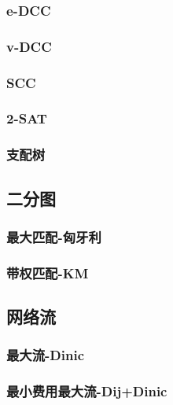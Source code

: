 \documentclass[twocolumn,a4]{article}
\newcommand{\addcpp}[1]{}
\begin{document}
		\subsubsection{e-DCC}
		\subsubsection{v-DCC}
		\subsubsection{SCC}
			\addcpp{graph/SCC}
		\subsubsection{2-SAT}
			\addcpp{graph/2-SAT}
		\subsubsection{支配树}
	\subsection{二分图}
		\subsubsection{最大匹配-匈牙利}		
			\addcpp{graph/hungary}
		\subsubsection{带权匹配-KM}
			\addcpp{graph/KM}
	\subsection{网络流}
		\subsubsection{最大流-Dinic}
			\addcpp{graph/MF_dinic}
		\subsubsection{最小费用最大流-Dij+Dinic}
			\addcpp{graph/MSMF_dij_dinic}
\end{document}
